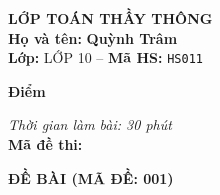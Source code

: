 \noindent
\begin{tcolorbox}[colback=white,colframe=black,arc=0mm,boxrule=0.8pt,top=4pt,bottom=4pt,left=6pt,right=6pt]
	\begin{minipage}[c]{0.44\textwidth}
		{\bfseries\large LỚP TOÁN THẦY THÔNG}\\[3pt]
		\textbf{Họ và tên:} \textbf{\large Quỳnh Trâm}\\[3pt]
		\textbf{Lớp:} LỚP 10 \quad -- \quad \textbf{Mã HS:} \texttt{HS011}
	\end{minipage}
	\hfill
	\begin{minipage}[c]{0.22\textwidth}
		\begin{tcolorbox}[colback=white,colframe=black,arc=0mm,boxrule=0.6pt,height=1.8cm,halign=center,valign=top,top=2pt]
			{\bfseries\normalsize Điểm}
		\end{tcolorbox}
	\end{minipage}
	\hfill
	\begin{minipage}[c]{0.30\textwidth}
		\raggedleft
		\textit{Thời gian làm bài: 30 phút}\\[4pt]
		\textbf{Mã đề thi:} 
	\end{minipage}
\end{tcolorbox}
\vspace{0.25cm}

\noindent\textbf{\large ĐỀ BÀI (MÃ ĐỀ: 001)}
\vspace{0.1cm}

